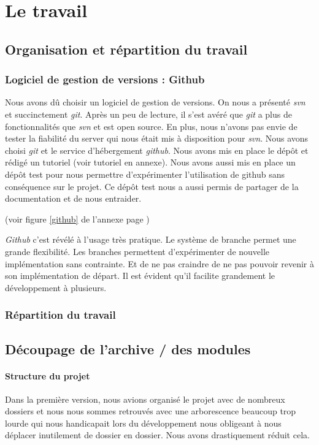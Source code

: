 \documentclass{report}
\begin{document}
\setcounter{chapter}{0}
\part{Le travail}

\chapter{Organisation et répartition du travail}
\section{Logiciel de gestion de versions : Github}
Nous avons dû choisir un logiciel de gestion de versions. On nous a présenté \emph{svn} et succinctement \emph{git}. Après un peu de lecture, il s’est avéré que \emph{git} a plus de fonctionnalités que \emph{svn} et est open source. En plus, nous n’avons pas envie de tester la fiabilité du server qui nous était mis à disposition pour \emph{svn}. Nous avons choisi \emph{git} et le service d’hébergement \emph{github}. Nous avons mis en place le dépôt et rédigé un tutoriel (voir tutoriel en annexe). Nous avons aussi mis en place un dépôt test pour nous permettre d’expérimenter l’utilisation de github sans conséquence sur le projet. Ce dépôt test nous a aussi permis de partager de la documentation et de nous entraider.

\begin{center} (voir figure \ref{github} de l'annexe page \pageref{github})\end{center}

\emph{Github} c’est révélé à l’usage très pratique. Le système de branche permet une grande flexibilité. Les branches permettent d’expérimenter de nouvelle implémentation sans contrainte. Et de ne pas craindre de ne pas pouvoir revenir à son implémentation de départ. Il est évident qu’il facilite grandement le développement à plusieurs.

\section{Répartition du travail}
\chapter{Découpage de l'archive /  des modules}
\subsection{Structure du projet}
Dans la première version, nous avions organisé le projet avec de nombreux dossiers et nous nous sommes retrouvés avec une arborescence beaucoup trop lourde qui nous handicapait lors du développement nous obligeant à nous déplacer inutilement de dossier en dossier. Nous avons drastiquement réduit cela.
\end{document}

